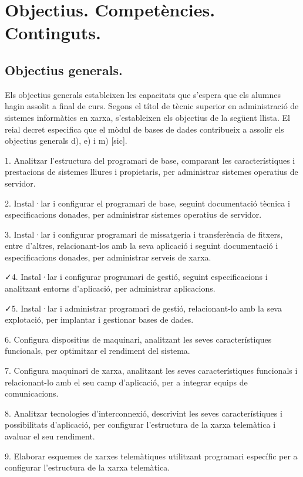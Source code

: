 \documentclass[catalan, a4paper, 12pt, titlepage]{article}
\begin{document}
\section{Objectius. Competències. Continguts.}
\label{sec:continguts}

\subsection{Objectius generals.}

Els objectius generals estableixen les capacitats que s'espera que els alumnes hagin assolit a final de curs. Segons el títol de tècnic superior en administració de sistemes informàtics en xarxa, s'estableixen els objectius de la següent llista.
El reial decret especifica que el mòdul de bases de dades contribueix a assolir els objectius generals d), e) i m) [sic].

1. Analitzar l'estructura del programari de base, comparant les característiques i prestacions de sistemes lliures i propietaris, per administrar sistemes operatius de servidor.

2. Instal·lar i configurar el programari de base, seguint documentació tècnica i especificacions donades, per administrar sistemes operatius de servidor.

3. Instal·lar i configurar programari de missatgeria i transferència de fitxers, entre d'altres, relacionant-los amb la seva aplicació i seguint documentació i especificacions donades, per administrar serveis de xarxa.

\faCheck 4. Instal·lar i configurar programari de gestió, seguint especificacions i analitzant entorns d'aplicació, per administrar aplicacions.

\faCheck 5. Instal·lar i administrar programari de gestió, relacionant-lo amb la seva explotació, per implantar i gestionar bases de dades.

6. Configura dispositius de maquinari, analitzant les seves característiques funcionals, per optimitzar el rendiment del sistema.

7. Configura maquinari de xarxa, analitzant les seves característiques funcionals i relacionant-lo amb el seu camp d'aplicació, per a integrar equips de comunicacions.

8. Analitzar tecnologies d'interconnexió, descrivint les seves característiques i possibilitats d'aplicació, per configurar l'estructura de la xarxa telemàtica i avaluar el seu rendiment.

9. Elaborar esquemes de xarxes telemàtiques utilitzant programari específic per a configurar l'estructura de la xarxa telemàtica.
\end{document}
